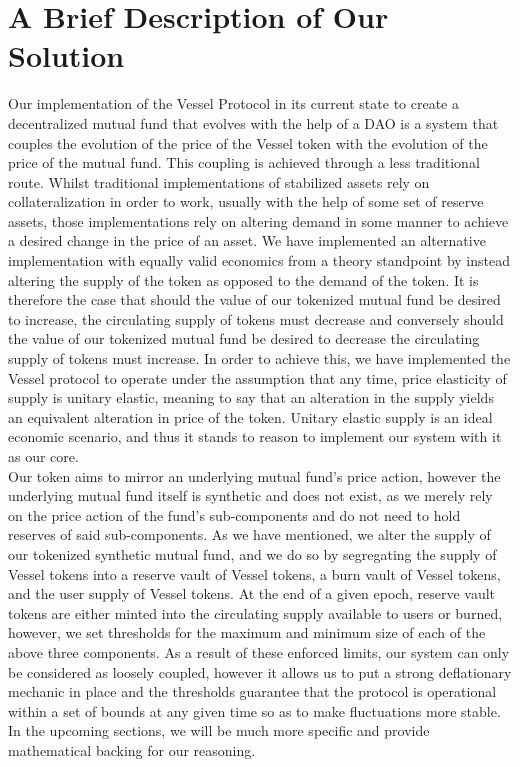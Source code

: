 \documentclass[letterpaper,11pt]{article}
\begin{document}
\section{A Brief Description of Our Solution}
Our implementation of the Vessel Protocol in its current state to create a decentralized mutual fund that evolves with the help of a DAO is a system that couples the evolution of the price of the Vessel token with the evolution of the price of the mutual fund. This coupling is achieved through a less traditional route. Whilst traditional implementations of stabilized assets rely on collateralization in order to work, usually with the help of some set of reserve assets, those implementations rely on altering demand in some manner to achieve a desired change in the price of an asset. We have implemented an alternative implementation with equally valid economics from a theory standpoint by instead altering the supply of the token as opposed to the demand of the token. It is therefore the case that should the value of our tokenized mutual fund be desired to increase, the circulating supply of tokens must decrease and conversely should the value of our tokenized mutual fund be desired to decrease the circulating supply of tokens must increase. In order to achieve this, we have implemented the Vessel protocol to operate under the assumption that any time, price elasticity of supply is unitary elastic, meaning to say that an alteration in the supply yields an equivalent alteration in price of the token. Unitary elastic supply is an ideal economic scenario, and thus it stands to reason to implement our system with it as our core. \\

Our token aims to mirror an underlying mutual fund’s price action, however the underlying mutual fund itself is synthetic and does not exist, as we merely rely on the price action of the fund’s sub-components and do not need to hold reserves of said sub-components. As we have mentioned, we alter the supply of our tokenized synthetic mutual fund, and we do so by segregating the supply of Vessel tokens into a reserve vault of Vessel tokens, a burn vault of Vessel tokens, and the user supply of Vessel tokens. At the end of a given epoch, reserve vault tokens are either minted into the circulating supply available to users or burned, however, we set thresholds for the maximum and minimum size of each of the above three components. As a result of these enforced limits, our system can only be considered as loosely coupled, however it allows us to put a strong deflationary mechanic in place and the thresholds guarantee that the protocol is operational within a set of bounds at any given time so as to make fluctuations more stable. In the upcoming sections, we will be much more specific and provide mathematical backing for our reasoning.
\end{document}
